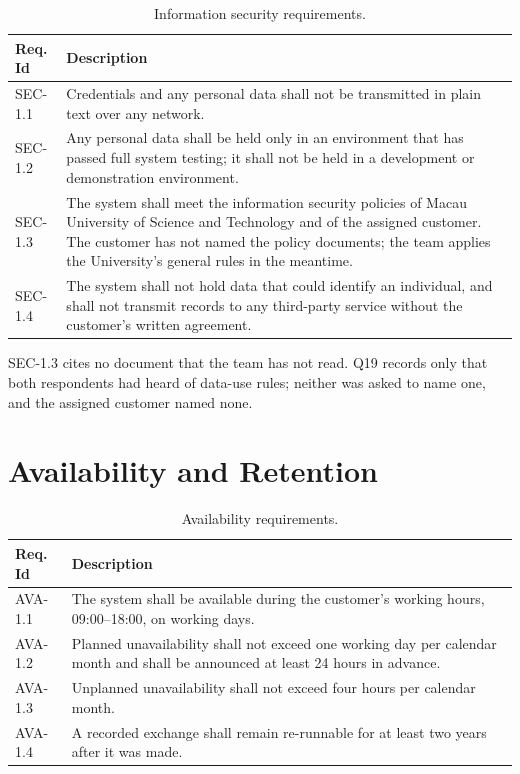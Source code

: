 \documentclass[12pt,a4paper]{report}
\begin{document}
\begin{table}[H]
  \centering
  \caption{Information security requirements.}
  \label{tab:security}
  \begin{tabular}{@{}l >{\raggedright\arraybackslash}p{13.0cm}@{}}
    \toprule[1.5pt]
    \textbf{Req. Id} & \textbf{Description} \\
    \midrule
    SEC-1.1 & Credentials and any personal data shall not be transmitted in
      plain text over any network. \\
    \addlinespace
    SEC-1.2 & Any personal data shall be held only in an environment that
      has passed full system testing; it shall not be held in a development
      or demonstration environment. \\
    \addlinespace
    SEC-1.3 & The system shall meet the information security policies of
      Macau University of Science and Technology and of the assigned
      customer. The customer has not named the policy documents; the team
      applies the University's general rules in the meantime. \\
    \addlinespace
    SEC-1.4 & The system shall not hold data that could identify an
      individual, and shall not transmit records to any third-party service
      without the customer's written agreement. \\
    \bottomrule[1.5pt]
  \end{tabular}
\end{table}

SEC-1.3 cites no document that the team has not read. Q19 records only that
both respondents had heard of data-use rules; neither was asked to name one,
and the assigned customer named none.

\section{Availability and Retention}
\label{sec:availability}

\begin{table}[H]
  \centering
  \caption{Availability requirements.}
  \label{tab:availability}
  \begin{tabular}{@{}l >{\raggedright\arraybackslash}p{13.0cm}@{}}
    \toprule[1.5pt]
    \textbf{Req. Id} & \textbf{Description} \\
    \midrule
    AVA-1.1 & The system shall be available during the customer's working
      hours, 09:00--18:00, on working days. \\
    \addlinespace
    AVA-1.2 & Planned unavailability shall not exceed one working day per
      calendar month and shall be announced at least 24 hours in advance. \\
    \addlinespace
    AVA-1.3 & Unplanned unavailability shall not exceed four hours per
      calendar month. \\
    \addlinespace
    AVA-1.4 & A recorded exchange shall remain re-runnable for at least two
      years after it was made. \\
    \bottomrule[1.5pt]
  \end{tabular}
\end{table}
\end{document}
